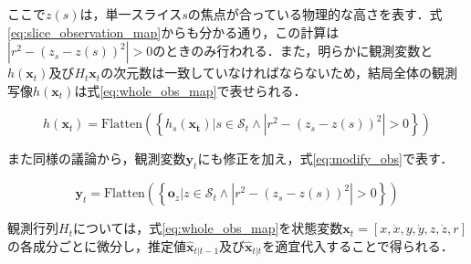 ここで$z(s)$は，単一スライス$s$の焦点が合っている物理的な高さを表す．式\ref{eq:slice_observation_map}からも分かる通り，この計算は$\left|r^2 - (z_s - z(s))^2\right| > 0$のときのみ行われる．また，明らかに観測変数と$h(\bm{x}_t)$及び$H_t \bm{x}_t$の次元数は一致していなければならないため，結局全体の観測写像$h(\bm{x}_t)$は式\ref{eq:whole_obs_map}で表せられる．

\begin{equation}
    \label{eq:whole_obs_map}
    h(\bm{x}_t) = \text{Flatten}(\left\{ \left. h_s(\bm{x_t}) \right| s \in \mathcal{S}_t \land \left|r^2 - (z_s - z(s))^2\right| > 0 \right\})
\end{equation}

また同様の議論から，観測変数$\bm{y}_t$にも修正を加え，式\ref{eq:modify_obs}で表す．

\begin{equation}
    \label{eq:modify_obs}
    \bm{y}_t = \text{Flatten}(\left\{ \left. \bm{o}_z \right| z \in \mathcal{S}_t \land  \left|r^2 - (z_s - z(s))^2\right| > 0 \right\})
\end{equation}

観測行列$H_t$については，式\ref{eq:whole_obs_map}を状態変数$\bm{x}_t = \left[x,\dot{x},y,\dot{y},z, \dot{z},r\right]$の各成分ごとに微分し，推定値$\hat{\bm{x}}_{t|t-1}$及び$\hat{\bm{x}}_{t|t}$を適宜代入することで得られる．
